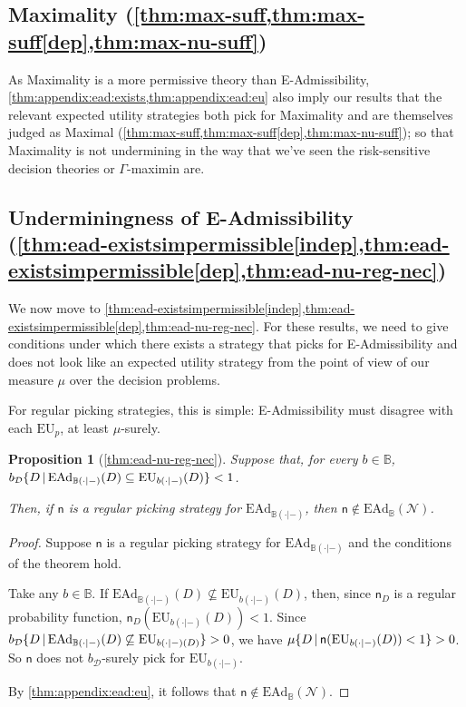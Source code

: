 \documentclass[a4paper]{article}
\newtheorem{proposition}[theorem]{Proposition}
\newcommand\EU{\mathrm{EU}}
\newcommand\EAd{\mathrm{EAd}}
\newcommand{\D}{\mathcal{D}}
\newcommand{\Decs}{\mathcal{D}}
\newcommand{\n}{\mathsf{n}}
\renewcommand{\nu}{\n}
\newcommand\Nu{\mathcal{N}}
\newcommand{\IB}{\mathbb{B}}
\newcommand\SetDelimiter[1][]{
	\nonscript\,#1\vert \allowbreak \nonscript\,\mathopen{}}
\providecommand\given{\SetDelimiter}
\newenvironment{CCM rewritten}
{\begingroup\color{blue}} %
{\endgroup}              %
\begin{document}
\subsection{Maximality (\cref{thm:max-suff,thm:max-suff[dep],thm:max-nu-suff})}\label{sect:maximality-appendix}
As Maximality is a more permissive theory than E-Admissibility, \cref{thm:appendix:ead:exists,thm:appendix:ead:eu} also imply our results that the relevant expected utility strategies both pick for Maximality and are themselves judged as Maximal (\cref{thm:max-suff,thm:max-suff[dep],thm:max-nu-suff}); so that Maximality is not undermining in the way that we've seen the risk-sensitive decision theories or $\Gamma$-maximin are.

\subsection{Underminingness of E-Admissibility \\(\cref{thm:ead-existsimpermissible[indep],thm:ead-existsimpermissible[dep],thm:ead-nu-reg-nec})}\label{sect:appendix:eadundermining}

We now move to \cref{thm:ead-existsimpermissible[indep],thm:ead-existsimpermissible[dep],thm:ead-nu-reg-nec}. For these results, we need to give conditions under which there exists a strategy that picks for E-Admissibility and does not look like an expected utility strategy from the point of view of our measure $\mu$ over the decision problems. 

For regular picking strategies, this is simple: E-Admissibility must disagree with each $\EU_p$, at least $\mu$-surely.

	\begin{proposition}[\cref{thm:ead-nu-reg-nec}]
	Suppose that, for every $b\in\IB$, $b_\D\{D\given \EAd_{\IB(\cdot|-)}(D)\subseteq\EU_{b(\cdot|-)}(D)\}<1$. 
	
	Then, if $\n$ is a regular picking strategy for $\EAd_{\IB(\cdot|-)}$, then $\n\notin \EAd_\IB(\Nu)$.
\end{proposition}

\begin{proof}
	Suppose $\nu$ is a regular picking strategy for $\EAd_{\IB(\cdot|-)}$ and the conditions of the theorem hold. 
	
	Take any $b\in\IB$.
	If $\EAd_{\IB(\cdot|-)}(D)\not\subseteq\EU_{b(\cdot|-)}(D)$, then, since $\n_D$ is a regular probability function, $\nu_D(\EU_{b(\cdot|-)}(D))< 1$. 
	Since 
	$b_\D\{D\given \EAd_{\IB(\cdot|-)}(D)\not\subseteq\EU_{b(\cdot|-)(D)}\}>0$, we have $\mu\{D\given \nu(\EU_{b(\cdot|-)}(D))<1\}>0$.
	 So $\nu$ does not $b_\Decs$-surely pick for $\EU_{b(\cdot|-)}$. 
	 
	 By \cref{thm:appendix:ead:eu}, it follows that $\nu\notin\EAd_\IB(\Nu)$. 
\end{proof}
\end{document}
